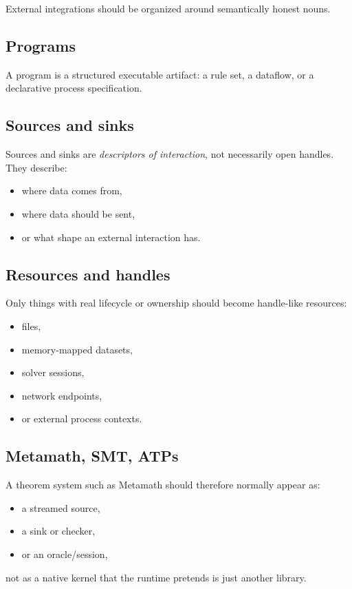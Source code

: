 \documentclass[11pt]{article}
\begin{document}
External integrations should be organized around semantically honest nouns.

\subsection{Programs}

A program is a structured executable artifact: a rule set, a dataflow, or a declarative process specification.

\subsection{Sources and sinks}

Sources and sinks are \emph{descriptors of interaction}, not necessarily open handles. They describe:
\begin{itemize}[leftmargin=2em]
  \item where data comes from,
  \item where data should be sent,
  \item or what shape an external interaction has.
\end{itemize}

\subsection{Resources and handles}

Only things with real lifecycle or ownership should become handle-like resources:
\begin{itemize}[leftmargin=2em]
  \item files,
  \item memory-mapped datasets,
  \item solver sessions,
  \item network endpoints,
  \item or external process contexts.
\end{itemize}

\subsection{Metamath, SMT, ATPs}

A theorem system such as Metamath should therefore normally appear as:
\begin{itemize}[leftmargin=2em]
  \item a streamed source,
  \item a sink or checker,
  \item or an oracle/session,
\end{itemize}
not as a native kernel that the runtime pretends is just another library.
\end{document}
